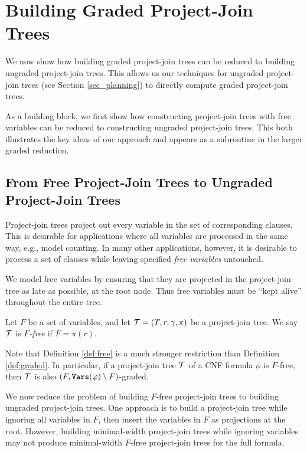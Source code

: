 \section{Building Graded Project-Join Trees}

We now show how building graded project-join trees can be reduced to building ungraded project-join trees. 
This allows us our techniques for ungraded project-join trees (see Section \ref{sec_planning}) to directly compute graded project-join trees.

As a building block, we first show how constructing project-join trees with free variables can be reduced to constructing ungraded project-join trees. This both illustrates the key ideas of our approach and appears as a subroutine in the larger graded reduction.

\subsection{From Free Project-Join Trees to Ungraded Project-Join Trees}
\label{sec:planning:free}
Project-join trees project out every variable in the set of corresponding clauses. This is desirable for applications where all variables are processed in the same way, e.g., model counting. In many other applications, however, it is desirable to process a set of clauses while leaving specified \emph{free variables} untouched. 
 
We model free variables by ensuring that they are projected in the project-join tree as late as possible, at the root node. Thus free variables must be ``kept alive'' throughout the entire tree.
\begin{definition}
\label{def:free}
Let $F$ be a set of variables, and let $\mathcal{T} = (T, r, \gamma, \pi)$ be a project-join tree. We say $\mathcal{T}$ is \emph{$F$-free} if $F = \pi(r)$.
\end{definition}

Note that Definition \ref{def:free} is a much stronger restriction than Definition \ref{def:graded}. 
In particular, if a project-join tree $\mathcal{T}$ of a CNF formula $\phi$ is $F$-free, then $\mathcal{T}$ is also $(F, \texttt{\upshape Vars}(\varphi) \setminus F)$-graded.

We now reduce the problem of building $F$-free project-join trees to building ungraded project-join trees. One approach is to build a project-join tree while ignoring all variables in $F$, then insert the variables in $F$ as projections at the root. 
However, building minimal-width project-join trees while ignoring variables may not produce minimal-width $F$-free project-join trees for the full formula.

